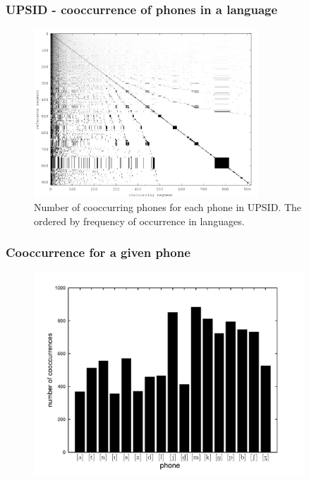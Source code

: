 \documentclass{beamer}
\begin{document}
\frame
{
  \frametitle{UPSID - cooccurrence of phones in a language}
  \begin{figure}[h!]
  \centering
  \includegraphics[width=0.75\textwidth]{imagespresentation/cooccurrence_matrix_upsid.png}
  \caption{Number of cooccurring phones for each phone in UPSID. The ordered by frequency of occurrence in languages.}
  \label{fig:cooccurrence_matrix_upsid}
  \end{figure}
}



\frame
{
  \frametitle{Cooccurrence for a given phone}
  \vspace{-0.5cm}
  \begin{figure}[h!]
  \centering
  \includegraphics[width=0.9\textwidth]{images/num_cooccurring_phones.pdf}
  \label{fig:numper_cooccurring_phones}
  \end{figure} 
}
\end{document}
